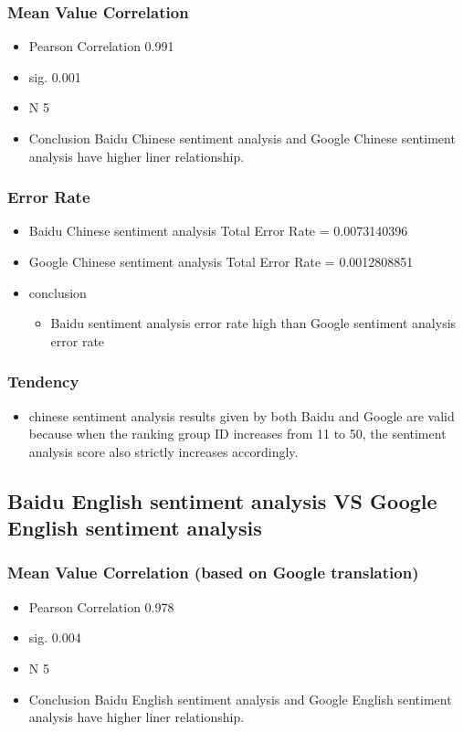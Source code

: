 \subsubsection{Mean Value Correlation}
\label{sec:org274133c}
\begin{itemize}
\item Pearson Correlation 0.991
\item sig. 0.001
\item N 5
\item Conclusion
Baidu Chinese sentiment analysis and Google Chinese sentiment analysis have higher liner relationship.
\end{itemize}

\subsubsection{Error Rate}
\label{sec:org39b131e}
\begin{itemize}
\item Baidu Chinese sentiment analysis Total Error Rate = 0.0073140396
\item Google Chinese sentiment analysis Total Error Rate = 0.0012808851
\item conclusion
\begin{itemize}
\item Baidu sentiment analysis error rate high than Google sentiment analysis error rate
\end{itemize}
\end{itemize}

\subsubsection{Tendency}
\label{sec:orgf129605}
\begin{itemize}
\item chinese sentiment analysis results given by both Baidu and Google are valid because when the ranking group ID increases from 11 to 50, the sentiment analysis score also strictly increases accordingly.
\end{itemize}

\subsection{Baidu English sentiment analysis VS Google English sentiment analysis}
\label{sec:org6a6efbc}
\subsubsection{Mean Value Correlation (based on Google translation)}
\label{sec:orgd406589}
\begin{itemize}
\item Pearson Correlation 0.978
\item sig. 0.004
\item N 5
\item Conclusion
Baidu English sentiment analysis and Google English sentiment analysis have higher liner relationship.
\end{itemize}
